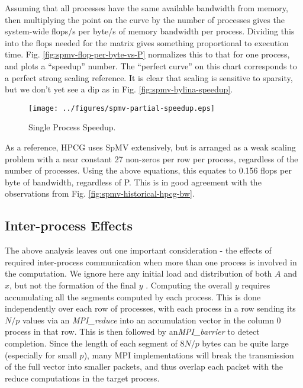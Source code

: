 
Assuming that all processes have the same available bandwidth from memory, then multiplying the point on the curve by the number of processes gives the system-wide flops/s per byte/s of memory bandwidth per process. Dividing this into the flops needed for the matrix gives something proportional to execution time. Fig. \ref{fig:spmv-flop-per-byte-vs-P} normalizes this to that for one process, and plots a ``speedup'' number. The ``perfect curve'' on this chart corresponds to a perfect strong scaling reference. It is clear that scaling is sensitive to sparsity, but we don't yet see a dip as in Fig.  \ref{fig:spmv-bylina-speedup}.

\begin{figure}\begin{centering}
\texttt{[image: ../figures/spmv-partial-speedup.eps]}
\caption{Single Process Speedup.}
\label{fig:spmv-partial-speedup}
\end{centering}\end{figure}

As a reference, HPCG uses SpMV extensively, but is arranged as a weak scaling problem with a near constant 27 non-zeros per row per process, regardless of the number of processes. Using the above equations, this equates to 0.156 flops per byte of bandwidth, regardless of P. This is in good agreement with the observations from Fig. \ref{fig:spmv-historical-hpcg-bw}.

\subsection{Inter-process Effects}

The above analysis leaves out one important consideration - the effects of required inter-process communication when more than one process is involved in the computation. We ignore here any initial load and distribution of both $A$ and $x$, but not the formation of the final $y$ . Computing the overall $y$ requires accumulating all the segments computed by each process. This is done independently over each row of processes, with each process in a row sending its $N/p$ values via an \emph{MPI\_reduce} into an accumulation vector in the column 0 process in that row. This is then followed by an\emph{MPI\_barrier} to detect completion. Since the length of each segment of $8N/p$ bytes can be quite large (especially for small $p$), many MPI implementations will break the transmission of the full vector into smaller packets, and thus overlap each packet with the reduce computations in the target process.

